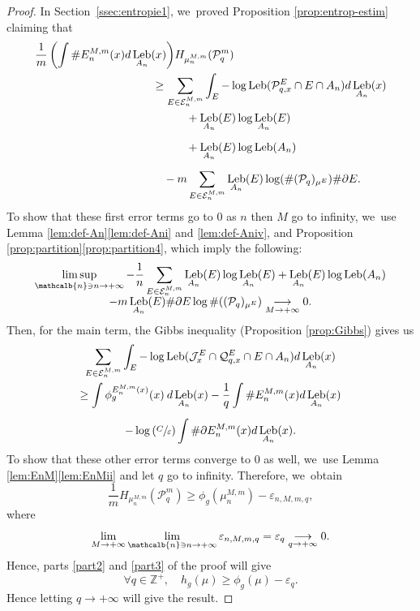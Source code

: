 \documentclass[JEP,XML,SOM,Unicode,NoFloatCountersInSection,published]{cedram}
\DeclareMathOperator{\Leb}{Leb}
\newcommand{\mcbn}{{\mathcalb{n}}}
\theoremstyle{definition}
\newcommand{\bbZ}{{\mathbb{Z}}}
\begin{document}
\begin{proof}
In Section~\ref{ssec:entropie1}, we~proved Proposition \ref{prop:entrop-estim} claiming that
\begin{align*}
\frac{1}{m} \left (\int \# E_n^{M,m}(x) d \Leb_{A_n}(x) \right) &H_{\mu_n^{M,m}}(\mathcal{P}_q^m)\\
&\hspace{-2em}\geq \sum_{E \in \mathcal{E}_n^{M,m}} \int_E - \log \Leb(\mathcal{P}_{q,x}^E \cap E \cap A_n) d \Leb_{A_n}(x)\\
&\hspace{1em}+ \Leb_{A_n}(E) \log \Leb_{A_n}(E)\\[0.5em]
&\hspace{1em}+ \Leb_{A_n}(E) \log \Leb(A_n)\\[0.5em]
&\hspace{-1em}- m \sum_{E \in \mathcal{E}_n^{M,m}} \Leb_{A_n}(E) \log (\# (\mathcal{P}_q)_{\mu^E}) \# \partial E.
\end{align*}
To show that these first error terms go to $0$ as $n$ then $M$ go to infinity, we~use Lemma \ref{lem:def-An}\eqref{lem:def-Ani} and \eqref{lem:def-Aniv}, and Proposition \ref{prop:partition}\eqref{prop:partition4}, which imply the following:\vspace{-5pt}
\begin{multline*}
\limsup_{\mcbn \ni n \to +\infty}-\frac{1}{n}\sum_{E \in \mathcal{E}_n^{M,m}} \Leb_{A_n}(E) \log \Leb_{A_n}(E) + \Leb_{A_n}(E) \log \Leb(A_n)\\[-5pt]
-m \Leb_{A_n}(E) \# \partial E \log \# ((\mathcal{P}_q)_{\mu^E}) \underset{M \to +\infty}{\longrightarrow} 0.
\end{multline*}
Then, for the main term, the Gibbs inequality (Proposition \ref{prop:Gibbs}) gives us
\begin{multline*}
\sum_{E \in \mathcal{E}_n^{M,m}} \int_E - \log \Leb(\mathcal{J}^E_x \cap \mathcal{Q}_{q,x}^E \cap E \cap A_n) d \Leb_{A_n}(x)\\
\geq \int \phi_g^{E_n^{M,m}(x)}(x) \: d \Leb_{A_n}(x) - \frac{1}{q} \int \# E_n^{M,m}(x) d \Leb_{A_n}(x)\\[0.5em]
- \log \left (\sfrac{C}{\varepsilon} \right) \int \# \partial E_n^{M,m}(x) d \Leb_{A_n}(x).
\end{multline*}
To show that these other error terms converge to $0$ as well, we~use Lemma \ref{lem:EnM}\eqref{lem:EnMii} and let $q$ go to infinity. Therefore, we~obtain
\[
\frac{1}{m} H_{\mu_n^{M,m}}(\mathcal{P}_q^m)
\geq \phi_g(\mu_n^{M,m}) - \varepsilon_{n,M,m,q},
\]
where
\[
\lim_{M \to +\infty} \lim_{\mcbn \ni n \to +\infty}\varepsilon_{n,M,m,q} = \varepsilon_q \underset{q \to +\infty}{\longrightarrow} 0.
\]
Hence, parts \ref{part2} and \ref{part3} of the proof will give
\[
\forall q \in \bbZ^+,\quad h_g(\mu) \geq \phi_g(\mu) - \varepsilon_q.
\]
Hence letting $q \to +\infty$ will give the result.


\end{proof}
\end{document}
